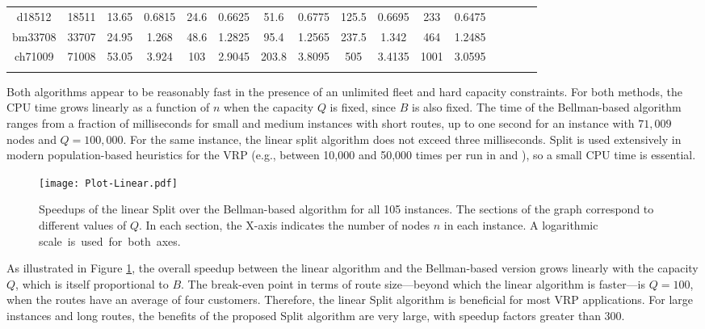 \documentclass[11pt]{article}
\begin{document}
\begin{table}[p]
{\begin{tabular}{|cc|cc|cc|cc|cc|cc|cc|cc}
d18512&18511&\num{13.65}&\num{0.6815}&\num{24.6}&\num{0.6625}&\num{51.6}&\num{0.6775}&\num{125.5}&\num{0.6695}&\num{233}&\num{0.6475}\\
bm33708&33707&\num{24.95}&\num{1.268}&\num{48.6}&\num{1.2825}&\num{95.4}&\num{1.2565}&\num{237.5}&\num{1.342}&\num{464}&\num{1.2485}\\
ch71009&71008&\num{53.05}&\num{3.924}&\num{103}&\num{2.9045}&\num{203.8}&\num{3.8095}&\num{505}&\num{3.4135}&\num{1001}&\num{3.0595}\\
\hline
\multicolumn{12}{c}{\vspace*{0.1cm}}
\end{tabular}
}
\endgroup 
\end{table}

Both algorithms appear to be reasonably fast in the presence of an unlimited fleet and hard capacity constraints. For both methods, the CPU time grows linearly as a function of $n$ when the capacity $Q$ is fixed, since $B$ is also fixed. The time of the  Bellman-based algorithm ranges from a  fraction of milliseconds for small and medium instances with short routes, up to one second for an instance with $71,009$ nodes and $Q=100,000$. For the same instance, the linear split algorithm does not exceed three milliseconds.
Split is used extensively in modern population-based heuristics for the VRP (e.g., between 10,000 and 50,000 times per run in \citealt{Prins2004} and \citealt{Vidal2012}), so a small CPU time is essential.

\begin{figure}[htbp]
\centering
\texttt{[image: Plot-Linear.pdf]}
\caption{Speedups of the linear Split over the Bellman-based algorithm for all 105 instances. The sections of the graph correspond to different values of $Q$. In each section, the X-axis indicates the number of nodes $n$ in each instance. A logarithmic scale~is~used~for~both~axes.}
\label{SpeedupLinear}
\end{figure}

As illustrated in Figure \ref{SpeedupLinear}, the overall speedup between the linear algorithm and the Bellman-based version grows linearly with the capacity $Q$, which is itself proportional to $B$. The break-even point in terms of route size---beyond which the linear algorithm is faster---is $Q = 100$, when the routes have an average of four customers. Therefore, the linear Split algorithm is beneficial for most VRP applications. For large instances and long routes, the benefits of the proposed Split algorithm are very large, with speedup factors greater than $300$.
\end{document}
